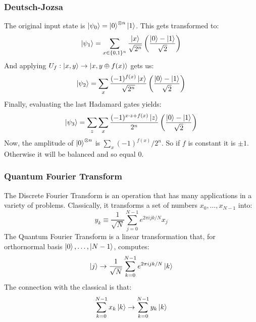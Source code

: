 \documentclass{beamer}
\begin{document}
        \begin{frame}
            \frametitle{Deutsch-Jozsa}
            The original input state is $\ket{\psi_0} = \ket{0}^{\otimes n}\ket{1}$.
            This gets transformed to:
            \begin{equation}
                \ket{\psi_1} = \sum_{x \in \{0,1\}^n}\frac{\ket{x}}{\sqrt{2^n}}\left(\frac{\ket{0} -\ket{1}}{\sqrt{2}} \right)
            \end{equation}
            And applying $U_f: \ket{x,y} \to \ket{x, y \oplus f(x)}$ gets us:
            \begin{equation}
                \ket{\psi_2} = \sum_x \frac{(-1)^{f(x)} \ket{x}}{\sqrt{2^n}}\left(\frac{\ket{0} -\ket{1}}{\sqrt{2}} \right)
            \end{equation}
            Finally, evaluating the last Hadamard gates yields:
            \begin{equation}
                \ket{\psi_3} = \sum_z \sum_x \frac{(-1)^{x\cdot z + f(x)}\ket{z}}{2^n}\left(\frac{\ket{0} -\ket{1}}{\sqrt{2}} \right)
            \end{equation}
            Now, the amplitude of $\ket{0}^{\otimes n}$ is $\sum_x (-1)^{f(x)}/2^n$. So if $f$ is constant
            it is $\pm 1$. Otherwise it will be balanced and so equal $0$. 
        \end{frame}
        \begin{frame}
            \frametitle{Quantum Fourier Transform}
            The Discrete Fourier Transform is an operation that has many applications in a variety of problems.
            Classically, it transforms a set of numbers $x_0, \dots, x_{N-1}$ into:
            \begin{equation}
                y_k \equiv \frac{1}{\sqrt{N}} \sum_{j=0}^{N - 1} e^{2\pi i j k / N} x_j
            \end{equation}
            The Quantum Fourier Transform is a linear transformation that,
            for orthornormal basis $\ket{0}, \dots, \ket{N -1}$, computes:
            \begin{equation}
                \ket{j} \to \frac{1}{\sqrt{N}} \sum_{k=0}^{N - 1} e^{2\pi i j k / N} \ket{k}
            \end{equation}
            The connection with the classical is that:
            \begin{equation}
                \sum_{k=0}^{N - 1} x_k \ket{k} \to  \sum_{k=0}^{N - 1} y_k \ket{k}
            \end{equation}
        \end{frame}
\end{document}
